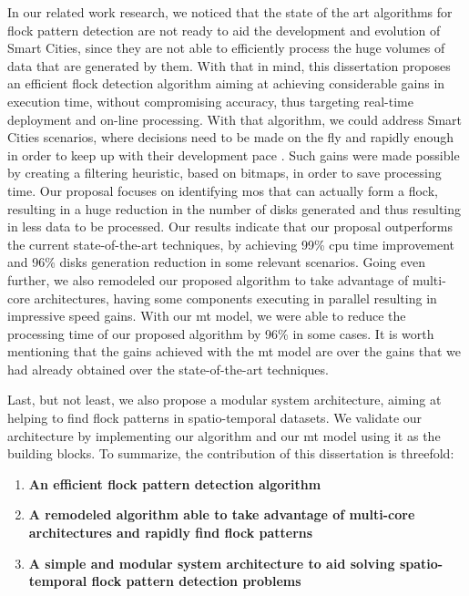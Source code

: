 In our related work research, we noticed that the state of the art algorithms for flock pattern detection are not ready
to aid the development and evolution of Smart Cities, since they are not able to efficiently process the huge volumes of
data that are generated by them. With that in mind, this dissertation proposes an efficient flock detection algorithm
aiming at achieving considerable gains in execution time, without compromising accuracy, thus targeting real-time
deployment and on-line processing. With that algorithm, we could address Smart Cities scenarios, where decisions need to
be made on the fly and rapidly enough in order to keep up with their development pace \cite{ieeesmartcities,
springersmartcities}. Such gains were made possible by creating a filtering heuristic, based on bitmaps, in order to
save processing time. Our proposal focuses on identifying \acp{mo} that can actually form a flock, resulting in a huge
reduction in the number of disks generated and thus resulting in less data to be processed. Our results indicate that
our proposal outperforms the current state-of-the-art techniques, by achieving 99\% \ac{cpu} time improvement and 96\%
disks generation reduction in some relevant scenarios. Going even further, we also remodeled our proposed algorithm to
take advantage of multi-core architectures, having some components executing in parallel resulting in impressive speed
gains. With our \ac{mt} model, we were able to reduce the processing time of our proposed algorithm by 96\% in some
cases. It is worth mentioning that the gains achieved with the \ac{mt} model are over the gains that we had already
obtained over the state-of-the-art techniques.

Last, but not least, we also propose a modular system architecture, aiming at helping to find flock patterns in
spatio-temporal datasets. We validate our architecture by implementing our algorithm and our \ac{mt} model using it as
the building blocks. To summarize, the contribution of this dissertation is threefold:

\begin{enumerate}
    \item \textbf{An efficient flock pattern detection algorithm}
    \item \textbf{A remodeled algorithm able to take advantage of multi-core architectures and rapidly find flock
        patterns}
    \item \textbf{A simple and modular system architecture to aid solving spatio-temporal flock pattern detection
        problems}
\end{enumerate}

